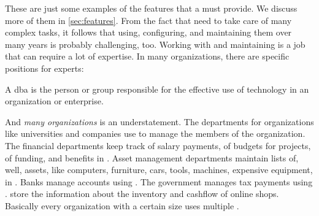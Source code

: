 These are just some examples of the features that a  must provide.
We discuss more of them in \cref{sec:features}.
From the fact that  need to take care of many complex tasks, it follows that using, configuring, and maintaining them over many years is probably challenging, too.
Working with and maintaining  is a job that can require a lot of expertise.
In many organizations, there are specific positions for  experts:%
%
\begin{definition}
A \acrfull{dba} is the person or group responsible for the effective use of  technology in an organization or enterprise.
\end{definition}%
%
And \emph{many organizations} is an understatement.
The  departments for organizations like universities and companies use  to manage the members of the organization.
The financial departments keep track of salary payments, of budgets for projects, of funding, and benefits in .
Asset management departments maintain lists of, well, assets, like computers, furniture, cars, tools, machines, expensive equipment, in .
Banks manage accounts using .
The government manages tax payments using .
 store the information about the inventory and cashflow of online shops.
Basically every organization with a certain size uses multiple .%
%
%
%
%
%
%
\endhsection\endhsection%
%
